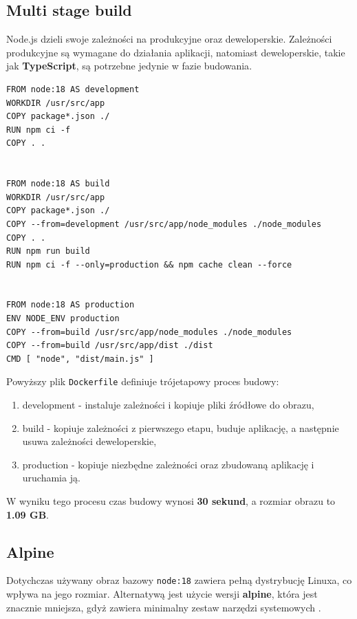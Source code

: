 \documentclass{article}
\begin{document}
\subsection{Multi stage build}

Node.js dzieli swoje zależności na produkcyjne oraz deweloperskie. Zależności produkcyjne są wymagane do działania aplikacji, natomiast deweloperskie, takie jak \textbf{TypeScript}, są potrzebne jedynie w fazie budowania\cite{NodejsAviary}.

\begin{lstlisting}[caption=Multistage plik Dockerfile]
FROM node:18 AS development
WORKDIR /usr/src/app
COPY package*.json ./
RUN npm ci -f
COPY . .


FROM node:18 AS build
WORKDIR /usr/src/app
COPY package*.json ./
COPY --from=development /usr/src/app/node_modules ./node_modules
COPY . .
RUN npm run build
RUN npm ci -f --only=production && npm cache clean --force


FROM node:18 AS production
ENV NODE_ENV production
COPY --from=build /usr/src/app/node_modules ./node_modules
COPY --from=build /usr/src/app/dist ./dist
CMD [ "node", "dist/main.js" ]
\end{lstlisting}

Powyższy plik \lstinline|Dockerfile| definiuje trójetapowy proces budowy:

\begin{enumerate}
    \item development - instaluje zależności i kopiuje pliki źródłowe do obrazu,
    \item build - kopiuje zależności z pierwszego etapu, buduje aplikację, a następnie usuwa zależności deweloperskie,
    \item production - kopiuje niezbędne zależności oraz zbudowaną aplikację i uruchamia ją.
\end{enumerate}

W wyniku tego procesu czas budowy wynosi \textbf{30 sekund}, a rozmiar obrazu to \textbf{1.09 GB}.

\subsection{Alpine}

Dotychczas używany obraz bazowy \lstinline|node:18| zawiera pełną dystrybucję Linuxa, co wpływa na jego rozmiar. Alternatywą jest użycie wersji \textbf{alpine}, która jest znacznie mniejsza, gdyż zawiera minimalny zestaw narzędzi systemowych \cite{DockerAlpine}.
\end{document}
